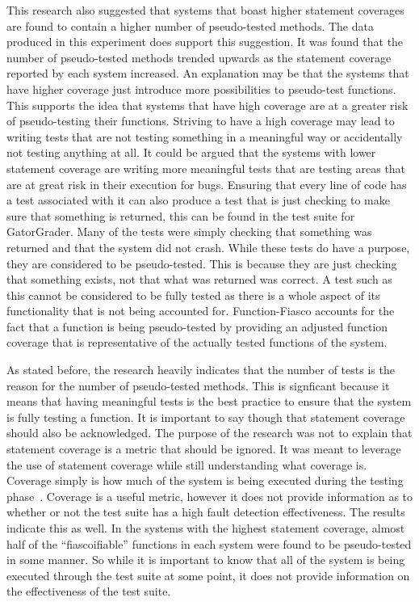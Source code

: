 This research also suggested that systems that boast higher statement coverages are found to contain a higher number of pseudo-tested methods. The data produced in this experiment does support this suggestion. It was found that the number of pseudo-tested methods trended upwards as the statement coverage reported by each system increased. An explanation may be that the systems that have higher coverage just introduce more possibilities to pseudo-test functions. This supports the idea that systems that have high coverage are at a greater risk of pseudo-testing their functions. Striving to have a high coverage may lead to writing tests that are not testing something in a meaningful way or accidentally not testing anything at all. It could be argued that the systems with lower statement coverage are writing more meaningful tests that are testing areas that are at great risk in their execution for bugs. Ensuring that every line of code has a test associated with it can also produce a test that is just checking to make sure that something is returned, this can be found in the test suite for GatorGrader. Many of the tests were simply checking that something was returned and that the system did not crash. While these tests do have a purpose, they are considered to be pseudo-tested. This is because they are just checking that something exists, not that what was returned was correct. A test such as this cannot be considered to be fully tested as there is a whole aspect of its functionality that is not being accounted for. Function-Fiasco accounts for the fact that a function is being pseudo-tested by providing an adjusted function coverage that is representative of the actually tested functions of the system.

As stated before, the research heavily indicates that the number of tests is the reason for the number of pseudo-tested methods. This is signficant because it means that having meaningful tests is the best practice to ensure that the system is fully testing a function. It is important to say though that statement coverage should also be acknowledged. The purpose of the research was not to explain that statement coverage is a metric that should be ignored. It was meant to leverage the use of statement coverage while still understanding what coverage is. Coverage simply is how much of the system is being executed during the testing phase~\cite{okken_2018}. Coverage is a useful metric, however it does not provide information as to whether or not the test suite has a high fault detection effectiveness. The results indicate this as well. In the systems with the highest statement coverage, almost half of the ``fiascoifiable'' functions in each system were found to be pseudo-tested in some manner. So while it is important to know that all of the system is being executed through the test suite at some point, it does not provide information on the effectiveness of the test suite.

